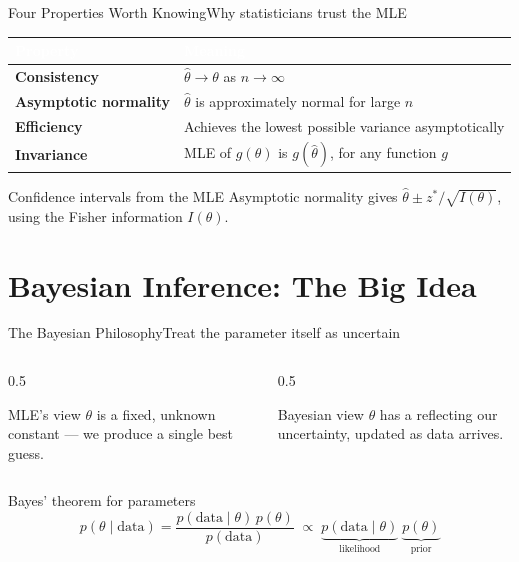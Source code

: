 \documentclass[aspectratio=169,11pt]{beamer}
\begin{document}
\begin{frame}{Four Properties Worth Knowing}{Why statisticians trust the MLE}
  \small
  \renewcommand{\arraystretch}{1.35}
  \begin{center}
  \begin{tabularx}{\textwidth}{@{}>{\bfseries}l >{\raggedright\arraybackslash}X@{}}
    \toprule
    \rowcolor{PrimaryDark}
    \textcolor{white}{Property} & \textcolor{white}{Meaning} \\
    \midrule
    Consistency & $\hat\theta \to \theta$ as $n\to\infty$ \\
    \rowcolor{PrimaryLight!25}
    Asymptotic normality & $\hat\theta$ is approximately normal for large $n$ \\
    Efficiency & Achieves the lowest possible variance asymptotically \\
    \rowcolor{PrimaryLight!25}
    Invariance & MLE of $g(\theta)$ is $g(\hat\theta)$, for any function $g$ \\
    \bottomrule
  \end{tabularx}
  \end{center}
  \begin{exampleblock}{Confidence intervals from the MLE}
    \small Asymptotic normality gives $\hat\theta \pm z^\ast/\sqrt{I(\theta)}$,
    using the Fisher information $I(\theta)$.
  \end{exampleblock}
\end{frame}

\section{Bayesian Inference: The Big Idea}

\begin{frame}{The Bayesian Philosophy}{Treat the parameter itself as uncertain}
  \begin{columns}[T]
    \begin{column}{0.5\textwidth}
      \begin{alertblock}{MLE's view}
        \small $\theta$ is a fixed, unknown constant — we produce a single
        best guess.
      \end{alertblock}
    \end{column}
    \begin{column}{0.5\textwidth}
      \begin{exampleblock}{Bayesian view}
        \small $\theta$ has a 
        reflecting our uncertainty, updated as data arrives.
      \end{exampleblock}
    \end{column}
  \end{columns}
  \vfill
  \begin{block}{Bayes' theorem for parameters}
    \[ p(\theta \mid \text{data}) = \frac{p(\text{data}\mid\theta)\,p(\theta)}{p(\text{data})}
       \;\propto\; \underbrace{p(\text{data}\mid\theta)}_{\text{likelihood}}\;\underbrace{p(\theta)}_{\text{prior}} \]
  \end{block}
\end{frame}
\end{document}
